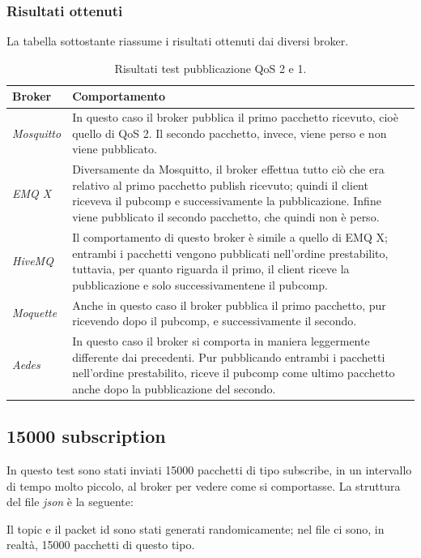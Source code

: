 \documentclass[binding=0.6cm,TFA]{sapthesis}
\begin{document}
\begin{large}
\newpage
\subsubsection{Risultati ottenuti}
La tabella sottostante riassume i risultati ottenuti dai diversi broker.
\begin{table}[h]
\caption{Risultati test pubblicazione QoS 2 e 1.}
\label{tab:resultsqos2and1}
\begin{tabular}{lp{}}
\toprule
\textbf{Broker} & \textbf{Comportamento} \\
\midrule
\textit{Mosquitto} & In questo caso il broker pubblica il primo pacchetto ricevuto, cioè quello di QoS 2. Il secondo pacchetto, invece, viene perso e non viene pubblicato. \\
\textit{EMQ X} & Diversamente da Mosquitto, il broker effettua tutto ciò che era relativo al primo pacchetto publish ricevuto; quindi il client riceveva il pubcomp e successivamente la pubblicazione. Infine viene pubblicato il secondo pacchetto, che quindi non è perso. \\
\textit{HiveMQ} & Il comportamento di questo broker è simile a quello di EMQ X; entrambi i pacchetti vengono pubblicati nell'ordine prestabilito, tuttavia, per quanto riguarda il primo, il client riceve la pubblicazione e solo successivamentene il pubcomp. \\
\textit{Moquette} & Anche in questo caso il broker pubblica il primo pacchetto, pur ricevendo dopo il pubcomp, e successivamente il secondo.\\
\textit{Aedes} & In questo caso il broker si comporta in maniera leggermente differente dai precedenti. Pur pubblicando entrambi i pacchetti nell'ordine prestabilito, riceve il pubcomp come ultimo pacchetto anche dopo la pubblicazione del secondo. \\
\bottomrule
\end{tabular}
\end{table}

\subsection{15000 subscription}
In questo test sono stati inviati 15000 pacchetti di tipo subscribe, in un intervallo di tempo molto piccolo, al broker per vedere come si comportasse. La struttura del file \textit{json} è la seguente:

\begin{python}
\end{python}
Il topic e il packet id sono stati generati randomicamente; nel file ci sono, in realtà, 15000 pacchetti di questo tipo. \\


\end{large}
\end{document}
